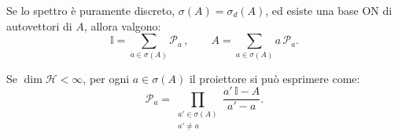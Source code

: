 Se lo spettro è puramente discreto, \(\sigma(A)= \sigma_d(A)\), ed esiste una base ON di autovettori di \(A\), allora valgono:
\[
    \mathbb{I}= \sum_{a\in \sigma(A)} \mathcal{P}_a\,,\qquad
    A= \sum_{a\in \sigma(A)} a\,\mathcal{P}_a.
\]

Se \(\dim \mathcal{H} < \infty\), per ogni \(a\in \sigma(A)\) il proiettore si può esprimere come:
\[
    \mathcal{P}_a= \prod_{\substack{a'\in \sigma(A)\\ a'\neq a}} \frac{a'\,\mathbb{I}- A}{a'-a}.
\]

